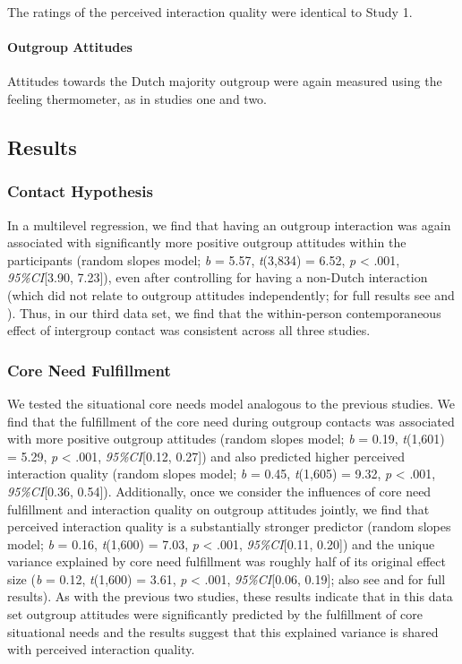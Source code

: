 The ratings of the perceived interaction quality were identical to Study
1.

\paragraph{Outgroup Attitudes}

Attitudes towards the Dutch majority outgroup were again measured using
the feeling thermometer, as in studies one and two.

\subsection{Results}

\subsubsection{Contact Hypothesis}

In a multilevel regression, we find that having an outgroup interaction
was again associated with significantly more positive outgroup attitudes
within the participants (random slopes model; \textit{b} = 5.57,
\textit{t}(3,834) = 6.52, \textit{p} \textless{} .001,
\textit{95\%CI}{[}3.90, 7.23{]}), even after controlling for having a
non-Dutch interaction (which did not relate to outgroup attitudes
independently; for full results see
 and
). Thus, in our third data set, we find
that the within-person contemporaneous effect of intergroup contact was
consistent across all three studies.

\subsubsection{Core Need Fulfillment}

We tested the situational core needs model analogous to the previous
studies. We find that the fulfillment of the core need during outgroup
contacts was associated with more positive outgroup attitudes (random
slopes model; \textit{b} = 0.19, \textit{t}(1,601) = 5.29, \textit{p}
\textless{} .001, \textit{95\%CI}{[}0.12, 0.27{]}) and also predicted
higher perceived interaction quality (random slopes model; \textit{b} =
0.45, \textit{t}(1,605) = 9.32, \textit{p} \textless{} .001,
\textit{95\%CI}{[}0.36, 0.54{]}). Additionally, once we consider the
influences of core need fulfillment and interaction quality on outgroup
attitudes jointly, we find that perceived interaction quality is a
substantially stronger predictor (random slopes model; \textit{b} =
0.16, \textit{t}(1,600) = 7.03, \textit{p} \textless{} .001,
\textit{95\%CI}{[}0.11, 0.20{]}) and the unique variance explained by
core need fulfillment was roughly half of its original effect size
(\textit{b} = 0.12, \textit{t}(1,600) = 3.61, \textit{p} \textless{}
.001, \textit{95\%CI}{[}0.06, 0.19{]}; also see
 and  for
full results). As with the previous two studies, these results indicate
that in this data set outgroup attitudes were significantly predicted by
the fulfillment of core situational needs and the results suggest that
this explained variance is shared with perceived interaction quality.

